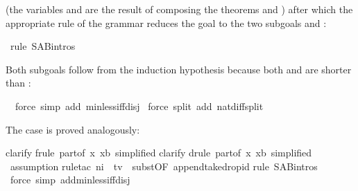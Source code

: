 \begin{isabellebody}
\begin{isamarkuptxt}%
\noindent
(the variables  and  are the result of composing the
theorems  and )
after which the appropriate rule of the grammar reduces the goal
to the two subgoals  and :%
\end{isamarkuptxt}%
\ rule\ S{\isacharunderscore}A{\isacharunderscore}B{\isachardot}intros{\isacharparenright}%
\begin{isamarkuptxt}%
Both subgoals follow from the induction hypothesis because both  and  are shorter than :%
\end{isamarkuptxt}%
\ \ force\ simp\ add{\isacharcolon}\ min{\isacharunderscore}less{\isacharunderscore}iff{\isacharunderscore}disj{\isacharparenright}\isanewline
\ force\ split\ add{\isacharcolon}\ nat{\isacharunderscore}diff{\isacharunderscore}split{\isacharparenright}%
\begin{isamarkuptxt}%
The case  is proved analogously:%
\end{isamarkuptxt}%
clarify{\isacharparenright}\isanewline
{}frule\ part{}{\isacharbrackleft}of\ {\isachardoublequote}{\isasymlambda}x{\isachardot}\ x{\isacharequal}b{\isachardoublequote}{\isacharcomma}\ simplified{\isacharbrackright}{\isacharparenright}\isanewline
{}clarify{\isacharparenright}\isanewline
{}drule\ part{}{\isacharbrackleft}of\ {\isachardoublequote}{\isasymlambda}x{\isachardot}\ x{\isacharequal}b{\isachardoublequote}{\isacharcomma}\ simplified{\isacharbrackright}{\isacharparenright}\isanewline
\ assumption{\isacharparenright}\isanewline
{}rule{\isacharunderscore}tac\ n{}{\isacharequal}i\ \ t{\isacharequal}v\ \ subst{\isacharbrackleft}OF\ append{\isacharunderscore}take{\isacharunderscore}drop{\isacharunderscore}id{\isacharbrackright}{\isacharparenright}\isanewline
{}rule\ S{\isacharunderscore}A{\isacharunderscore}B{\isachardot}intros{\isacharparenright}\isanewline
\ force\ simp\ add{\isacharcolon}min{\isacharunderscore}less{\isacharunderscore}iff{\isacharunderscore}disj{\isacharparenright}\isanewline

\end{isabellebody}
